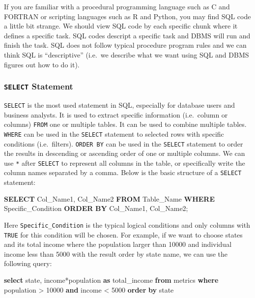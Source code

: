 \documentclass[12pt,]{krantz}
\makeatletter
\newenvironment{Shaded}{\begin{snugshade}}{\end{snugshade}}
\newcommand{\DecValTok}[1]{\textcolor[rgb]{0.06,0.06,0.06}{#1}}
\newcommand{\KeywordTok}[1]{\textcolor[rgb]{0.27,0.27,0.27}{\textbf{#1}}}
\newcommand{\NormalTok}[1]{#1}
\newenvironment{kframe}{%
\medskip{}
\setlength{\fboxsep}{.8em}
 \def\at@end@of@kframe{}%
 \ifinner\ifhmode%
  \def\at@end@of@kframe{\end{minipage}}%
  \begin{minipage}{\columnwidth}%
 \fi\fi%
 \def\FrameCommand##1{\hskip\@totalleftmargin \hskip-\fboxsep
 \colorbox{shadecolor}{##1}\hskip-\fboxsep
     \hskip-\linewidth \hskip-\@totalleftmargin \hskip\columnwidth}%
 \MakeFramed {\advance\hsize-\width
   \@totalleftmargin\z@ \linewidth\hsize
   \@setminipage}}%
 {\par\unskip\endMakeFramed%
 \at@end@of@kframe}
\renewenvironment{Shaded}{\begin{kframe}}{\end{kframe}}
\makeatother
\begin{document}
If you are familiar with a procedural programming language such as C and FORTRAN or scripting languages such as R and Python, you may find SQL code a little bit strange. We should view SQL code by each specific chunk where it defines a specific task. SQL codes descript a specific task and DBMS will run and finish the task. SQL does not follow typical procedure program rules and we can think SQL is ``descriptive'' (i.e.~we describe what we want using SQL and DBMS figures out how to do it).

\hypertarget{select-statement}{%
\subsubsection{\texorpdfstring{\texttt{SELECT} Statement}{SELECT Statement}}\label{select-statement}}

\texttt{SELECT} is the most used statement in SQL, especially for database users and business analysts. It is used to extract specific information (i.e.~column or columns) \texttt{FROM} one or multiple tables. It can be used to combine multiple tables. \texttt{WHERE} can be used in the \texttt{SELECT} statement to selected rows with specific conditions (i.e.~filters). \texttt{ORDER\ BY} can be used in the \texttt{SELECT} statement to order the results in descending or ascending order of one or multiple columns. We can use \texttt{*} after \texttt{SELECT} to represent all columns in the table, or specifically write the column names separated by a comma. Below is the basic structure of a \texttt{SELECT} statement:

\begin{Shaded}
\begin{Highlighting}[]
\KeywordTok{SELECT}\NormalTok{ Col_Name1, Col_Name2}
\KeywordTok{FROM}\NormalTok{ Table_Name}
\KeywordTok{WHERE}\NormalTok{ Specific_Condition}
\KeywordTok{ORDER} \KeywordTok{BY}\NormalTok{ Col_Name1, Col_Name2;}
\end{Highlighting}
\end{Shaded}

Here \texttt{Specific\_Condition} is the typical logical conditions and only columns with \texttt{TRUE} for this condition will be chosen. For example, if we want to choose states and its total income where the population larger than 10000 and individual income less than 5000 with the result order by state name, we can use the following query:

\begin{Shaded}
\begin{Highlighting}[]
\KeywordTok{select}\NormalTok{ state, income*population }\KeywordTok{as}\NormalTok{ total_income}
\KeywordTok{from}\NormalTok{ metrics}
\KeywordTok{where}\NormalTok{ population > }\DecValTok{10000} \KeywordTok{and}\NormalTok{ income < }\DecValTok{5000}
\KeywordTok{order} \KeywordTok{by}\NormalTok{ state}
\end{Highlighting}
\end{Shaded}
\end{document}
